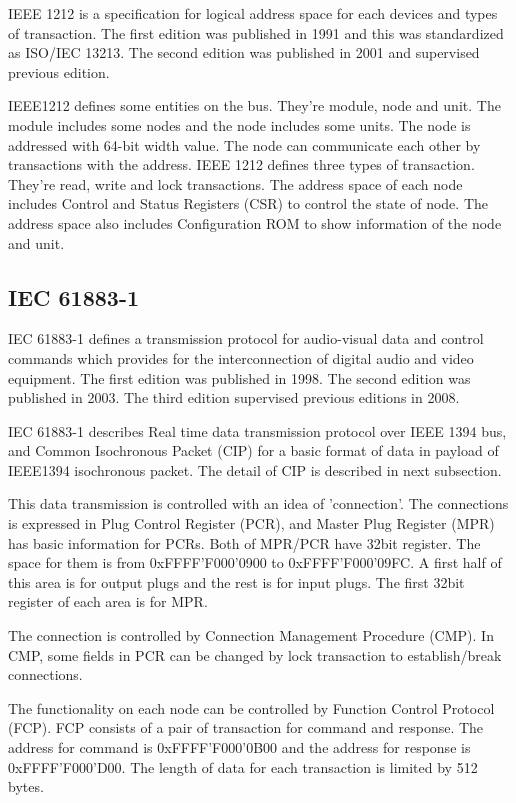 \documentclass[onecolumn]{article}
\begin{document}
IEEE 1212 is a specification for logical address space for each devices and types of transaction. The first edition was published in 1991\cite{ieee1212-1} and this was standardized as ISO/IEC 13213\cite{iso13213}. The second edition was published in 2001\cite{ieee1212-2} and supervised previous edition.

IEEE1212 defines some entities on the bus. They're module, node and unit. The module includes some nodes and the node includes some units. The node is addressed with 64-bit width value. The node can communicate each other by transactions with the address. IEEE 1212 defines three types of transaction. They're read, write and lock transactions. The address space of each node includes Control and Status Registers (CSR) to control the state of node. The address space also includes Configuration ROM to show information of the node and unit.


\subsection{IEC 61883-1}

IEC 61883-1 defines a transmission protocol for audio-visual data and control commands which provides for the interconnection of digital audio and video equipment. The first edition was published in 1998\cite{iec61883-1-1}. The second edition was published in 2003\cite{iec61883-1-2}. The third edition supervised previous editions in 2008\cite{iec61883-1-3}.

IEC 61883-1 describes Real time data transmission protocol over IEEE 1394 bus, and Common Isochronous Packet (CIP) for a basic format of data in payload of IEEE1394 isochronous packet. The detail of CIP is described in next subsection.

This data transmission is controlled with an idea of 'connection'. The connections is expressed in Plug Control Register (PCR), and Master Plug Register (MPR) has basic information for PCRs. Both of MPR/PCR have 32bit register. The space for them is from 0xFFFF'F000'0900 to 0xFFFF'F000'09FC. A first half of this area is for output plugs and the rest is for input plugs. The first 32bit register of each area is for MPR.

The connection is controlled by Connection Management Procedure (CMP). In CMP, some fields in PCR can be changed by lock transaction to establish/break connections.

The functionality on each node can be controlled by Function Control Protocol (FCP). FCP consists of a pair of transaction for command and response. The address for command is 0xFFFF'F000'0B00 and the address for response is 0xFFFF'F000'D00. The length of data for each transaction is limited by 512 bytes.
\end{document}
